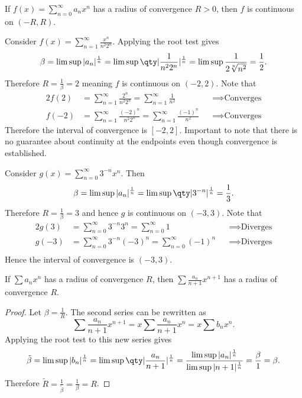 \documentclass[../notes.tex]{subfiles}
\begin{document}
\begin{corollary}
    If $f(x) = \displaystyle \sum_{n=0}^\infty a_n x^n$ has a radius of convergence $R > 0$, then $f$ is continuous on $(-R, R)$.
\end{corollary}

\begin{example}
    Consider $f(x) = \displaystyle \sum_{n=1}^\infty \frac{x^n}{n^2 2^n}$. Applying the root test gives
    \[
        \beta = \limsup |a_n|^\frac{1}{n} = \limsup \qty|\frac{1}{n^2 2^n}|^\frac{1}{n} = \limsup \frac{1}{2 \sqrt[n]{n^2}} = \frac{1}{2}
    .\]
    Therefore $R = \frac{1}{\beta} = 2$ meaning $f$ is continuous on $(-2, 2)$. Note that
    \begin{alignat*}{2}
        f(2) &= \sum_{n=1}^\infty \frac{2^n}{n^2 2^n} = \sum_{n=1}^\infty \frac{1}{n^2} &&\implies \text{Converges} \\
        f(-2) &= \sum_{n=1}^\infty \frac{(-2)^n}{n^2 2^n} = \sum_{n=1}^\infty \frac{(-1)^n}{n^2} &&\implies \text{Converges}
    \end{alignat*}
    Therefore the interval of convergence is $[-2, 2]$. Important to note that there is no guarantee about continuity at the endpoints even though convergence is established.
\end{example}

\begin{example}
    Consider $g(x) = \displaystyle \sum_{n=0}^\infty 3^{-n} x^n$. Then
    \[
        \beta = \limsup |a_n|^\frac{1}{n} = \limsup \qty|3^{-n}|^\frac{1}{n} = \frac{1}{3}
    .\]
    Therefore $R = \frac{1}{\beta} = 3$ and hence $g$ is continuous on $(-3, 3)$. Note that
    \begin{alignat*}{2}
        g(3) &= \sum_{n=0}^\infty 3^{-n} 3^n = \sum_{n=0}^\infty 1 &&\implies \text{Diverges} \\
        g(-3) &= \sum_{n=0}^\infty 3^{-n} (-3)^n = \sum_{n=0}^\infty (-1)^n &&\implies \text{Diverges} \\
    \end{alignat*}
    Hence the interval of convergence is $(-3, 3)$.
\end{example}

\begin{lemma}
    If $\sum a_n x^n$ has a radius of convergence $R$, then $\sum \frac{a_n}{n+1} x^{n+1}$ has a radius of convergence $R$.
\end{lemma}

\begin{proof}
    Let $\beta = \frac{1}{R}$. The second series can be rewritten as
    \[
        \sum \frac{a_n}{n+1} x^{n+1} = x \sum \frac{a_n}{n+1} x^n = x \sum b_n x^n
    .\]
    Applying the root test to this new series gives
    \[
        \tilde{\beta} = \limsup |b_n|^\frac{1}{n} = \limsup \qty|\frac{a_n}{n+1}|^\frac{1}{n} = \frac{\limsup |a_n|^\frac{1}{n}}{\limsup |n+1|^\frac{1}{n}} = \frac{\beta}{1} = \beta
    .\]
    Therefore $\tilde{R} = \frac{1}{\tilde{\beta}} = \frac{1}{\beta} = R$.
\end{proof}
\end{document}
